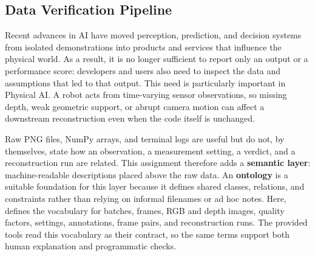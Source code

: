 \documentclass[11pt]{article}
\newcommand{\code}[1]{\texttt{\detokenize{#1}}}
\begin{document}





\subsection{Data Verification Pipeline}
Recent advances in AI have moved perception, prediction, and decision systems
from isolated demonstrations into products and services that influence the
physical world. As a result, it is no longer sufficient to report only an
output or a performance score: developers and users also need to inspect the
data and assumptions that led to that output. This need is particularly
important in Physical AI. A robot acts from time-varying sensor observations,
so missing depth, weak geometric support, or abrupt camera motion can affect a
downstream reconstruction even when the code itself is unchanged.

Raw PNG files, NumPy arrays, and terminal logs are useful but do not, by
themselves, state how an observation, a measurement setting, a verdict, and a
reconstruction run are related. This assignment therefore adds a
\textbf{semantic layer}: machine-readable descriptions placed above the raw
data. An \textbf{ontology} is a suitable foundation for this layer because it
defines shared classes, relations, and constraints rather than relying on
informal filenames or ad hoc notes. Here,
\code{ontology/hw1.ttl} defines the vocabulary for batches, frames, RGB and
depth images, quality factors, settings, annotations, frame pairs, and
reconstruction runs. The provided tools read this vocabulary as their
contract, so the same terms support both human explanation and programmatic
checks.
\end{document}
